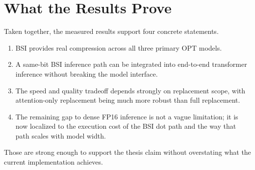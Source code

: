 \section{What the Results Prove}
Taken together, the measured results support four concrete statements.

\begin{enumerate}[leftmargin=2em]
\item BSI provides real compression across all three primary OPT models.
\item A same-bit BSI inference path can be integrated into end-to-end transformer inference without breaking the model interface.
\item The speed and quality tradeoff depends strongly on replacement scope, with attention-only replacement being much more robust than full replacement.
\item The remaining gap to dense FP16 inference is not a vague limitation; it is now localized to the execution cost of the BSI dot path and the way that path scales with model width.
\end{enumerate}

Those are strong enough to support the thesis claim without overstating what the current implementation achieves.
